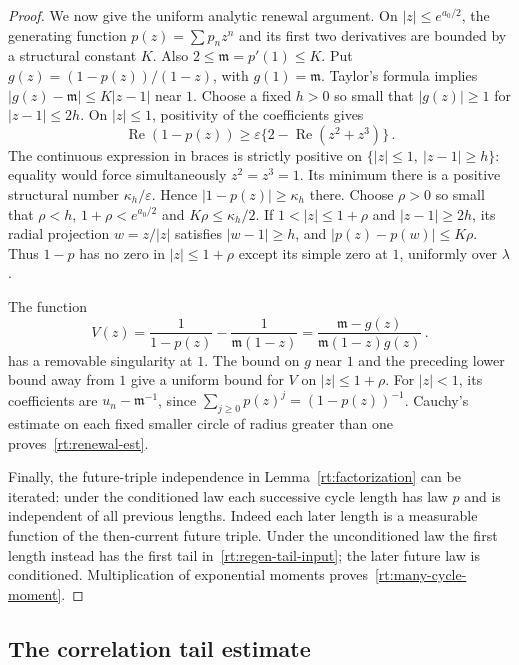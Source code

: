 \documentclass[11pt]{amsart}
\theoremstyle{definition}
\theoremstyle{remark}
\numberwithin{equation}{section}
\begin{document}
\begin{proof}
We now give the uniform analytic renewal argument. On $|z|\leq e^{a_0/2}$, the generating function $p(z)=\sum p_nz^n$ and its first two derivatives are bounded by a structural constant $K$. Also $2\leq\mathfrak m=p'(1)\leq K$. Put $g(z)=(1-p(z))/(1-z)$, with $g(1)=\mathfrak m$. Taylor's formula implies $|g(z)-\mathfrak m|\leq K|z-1|$ near $1$. Choose a fixed $h>0$ so small that $|g(z)|\geq1$ for $|z-1|\leq2h$. On $|z|\leq1$, positivity of the coefficients gives
\begin{equation*}
 \operatorname{Re}(1-p(z))
 \geq\varepsilon\{2-\operatorname{Re}(z^2+z^3)\}\, .
\end{equation*}
The continuous expression in braces is strictly positive on $\{|z|\leq1,\ |z-1|\geq h\}$: equality would force simultaneously $z^2=z^3=1$. Its minimum there is a positive structural number $\kappa_h/\varepsilon$. Hence $|1-p(z)|\geq\kappa_h$ there. Choose $\rho>0$ so small that $\rho<h$, $1+\rho<e^{a_0/2}$ and $K\rho\leq\kappa_h/2$. If $1<|z|\leq1+\rho$ and $|z-1|\geq2h$, its radial projection $w=z/|z|$ satisfies $|w-1|\geq h$, and $|p(z)-p(w)|\leq K\rho$. Thus $1-p$ has no zero in $|z|\leq1+\rho$ except its simple zero at $1$, uniformly over $\lambda$.

The function
\begin{equation*}
 V(z)=\frac1{1-p(z)}-\frac1{\mathfrak m(1-z)}
     =\frac{\mathfrak m-g(z)}{\mathfrak m(1-z)g(z)}\, .
\end{equation*}
has a removable singularity at $1$. The bound on $g$ near $1$ and the preceding lower bound away from $1$ give a uniform bound for $V$ on $|z|\leq1+\rho$. For $|z|<1$, its coefficients are $u_n-\mathfrak m^{-1}$, since $\sum_{j\geq0}p(z)^j=(1-p(z))^{-1}$. Cauchy's estimate on each fixed smaller circle of radius greater than one proves~\eqref{rt:renewal-est}.

Finally, the future-triple independence in Lemma~\ref{rt:factorization} can be iterated: under the conditioned law each successive cycle length has law $p$ and is independent of all previous lengths. Indeed each later length is a measurable function of the then-current future triple. Under the unconditioned law the first length instead has the first tail in~\eqref{rt:regen-tail-input}; the later future law is conditioned. Multiplication of exponential moments proves~\eqref{rt:many-cycle-moment}.
\end{proof}

\subsection{The correlation tail estimate}\label{regen.occupation-sec}
\end{document}

